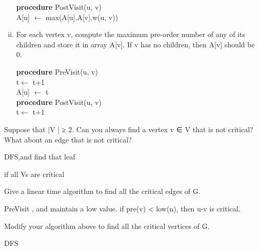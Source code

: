 \documentclass[11pt]{article}
\begin{document}
\begin{subparts}
\begin{enumerate}[i.]
\begin{solution}
            \textbf{procedure} PostVisit(u, v) \\
            \quad A[u] $\leftarrow$ max(A[u],A[v],w(u, v))
        \end{solution}

        \item For each vertex v, compute the maximum pre-order number of any of its children and store it in array A[v]. If v has no children, then A[v] should be 0. \par
        \begin{solution} \par
            \textbf{procedure} PreVisit(u, v) \\
            \quad t$\leftarrow$ t+1 \\
            \quad A[u] $\leftarrow$ t \\
            
            \textbf{procedure} PostVisit(u, v) \\
            \quad t$\leftarrow$ t+1 \\
        \end{solution} 
    \end{enumerate}

\end{subparts}


\begin{subparts}
    \item Suppose that |V | ≥ 2. Can you always find a vertex v ∈ V that is not critical? What about an edge that is not critical? \par
    \begin{solution}
        DFS,and find that leaf \par
        if all Vs are critical \par
    \end{solution}

    \item Give a linear time algorithm to find all the critical edges of G. \par
    \begin{solution}
        PreVisit , and maintain a low value. if pre(v) < low(n), then u-v is critical. \par

    \end{solution}

    \item Modify your algorithm above to find all the critical vertices of G.\par
    \begin{solution}
        DFS
    \end{solution}
\end{subparts}
\end{document}
